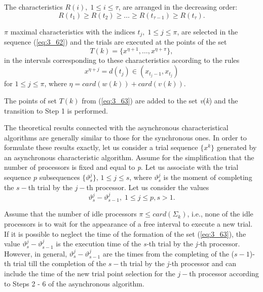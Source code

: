 \begin{description} 
	\item [\textbf{Step 5.}] {The characteristics $R(i),\; 1\le i\le \tau $, are arranged in the decreasing order:
	\begin{equation}
	\label{eq:3_62}
	R(t_{1} )\ge R(t_{2} )\ge \ldots \ge R(t_{\tau -1} )\ge R(t_{\tau } ).
	\end{equation}
	}
	\item [\textbf{Step 6.}] {$\pi$ maximal characteristics with the indices $t_j ,\; 1\le j\le \pi $, are selected in the sequence  (\ref{eq:3_62}) and the trials are executed at the points of the set 
	\begin{equation}
	\label{eq:3_63}
	T(k)=\{ x^{\eta +1} ,\ldots ,x^{\eta +\pi } \} ,
	\end{equation}
	in the intervals corresponding to these characteristics according to the rules 
	\begin{equation*}
	x^{\eta +j} =d(t_{j} )\in (x_{t_{j} -1} ,x_{t_{j} } )
	\end{equation*}	
	for $1\le j\le \pi $, where $\eta =card(w(k))+card(v(k))$.
	}
	\item [\textbf{Step 7.}] {The points of set $T(k)$ from  (\ref{eq:3_63}) are added to the set \textit{v}(\textit{k}) and the transition to Step 1 is performed.}
	\end{description}
	
	The theoretical results connected with the asynchronous characteristical algorithms are generally similar to those for the synchronous ones. In order to formulate these results exactly, let us consider a trial sequence $\{ x^k\} $ generated by an asynchronous characteristic algorithm. Assume for the simplification that the number of processors is fixed and equal to \textit{p}. Let us associate with the trial sequence $p$ subsequences $\{ \vartheta _{s}^{j} \} ,\, 1\le j\le s$, where $\vartheta _{s}^{j} $ is the moment of completing the $s-$th trial by the $j-$th processor. Let us consider the values
	\begin{equation}
	\label{eq:3_64}
	\vartheta _{s}^{j} -\vartheta _{s-1}^{j} ,\; 1\le j\le p,s>1.
	\end{equation}
	
	Assume that the number of idle processors $\pi \le card(\Sigma _{k} )$, i.e., none of the idle processors is to wait for the appearance of a free interval to execute a new trial. If it is possible to neglect the time of the formation of the set  (\ref{eq:3_63}), the value $\vartheta _{s}^{j} -\vartheta _{s-1}^j $ is the execution time of the \textit{s-}th trial by the \textit{j-}th processor. However, in general, $\vartheta _{s}^j -\vartheta _{s-1}^{j} $ are the times from the completing of the ($s - 1$)-th trial till the completion of the $s-$th trial by the \textit{j-}th processor and can include the time of the new trial point selection for the $j-$th processor according to Steps 2 - 6 of the asynchronous algorithm. 
	
